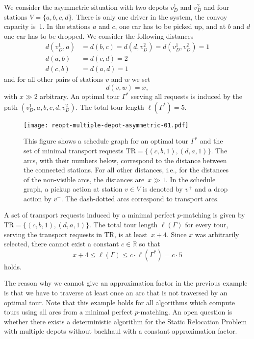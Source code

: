 \documentclass[english]{llncs}
\numberwithin{sublemma}{lemma}
\newcommand{\RR}{\ensuremath{\mathbb{R}}}
\newcommand{\tourd}{\ensuremath{\Gamma}}
\newcommand{\dist}{\ensuremath{d}}
\newcommand{\TR}{\mathrm{TR}}
\begin{document}
\begin{example}\label{ex: static: reopt: multiple: asymmetric non possible}
We consider the asymmetric situation with two depots $v_D^1$ and $v_D^2$ and four stations $V = \{ a, b, c, d \}$.
There is only one driver in the system, the convoy capacity is~$1$.
In the stations $a$ and $c$, one car has to be picked up, and at $b$ and $d$ one car has to be dropped.
We consider the following distances
\begin{align*}
  d(v_D^1, a) & = d(b, c) = d(d, v_D^2) = \dist(v_D^1, v_D^2) = 1 \\
  d(a, b) & = d(c, d) = 2 \\
  d(c, b) & = d(a, d) = 1
\end{align*}
and for all other pairs of stations $v$ and $w$ we set
\[
 d(v, w) = x,
\]
with $x \gg 2$ arbitrary.
An optimal tour $\tourd^*$ serving all requests is induced by the path $(v_D^1, a, b, c, d, v_D^2)$.
The total tour length $\ell(\tourd^*) = 5$.

\begin{figure}[ht]
    \centering
    \texttt{[image: reopt-multiple-depot-asymmetric-01.pdf]}
 \caption{
  This figure shows a schedule graph for an optimal tour ${\tourd^*}$ and the set of minimal transport requests $\TR = \{ (c, b, 1), (d, a, 1) \}$.
  The arcs, with their numbers below, correspond to the distance between the connected stations.
  For all other distances, i.e., for the distances of the non-visible arcs, the distances are~$x \gg 1$.
  In the schedule graph, a pickup action at station $v \in V$ is denoted by $v^+$ and a drop action by $v^-$.
  The dash-dotted arcs correspond to transport arcs.
 }
 \label{fig: static: reopt: multiple: asymmetric 01}
\end{figure}


A set of transport requests induced by a minimal perfect $p$-matching is given by $\TR = \{ (c, b, 1), (d, a, 1) \}$.
The total tour length $\ell(\tourd)$ for every tour, serving the transport requests in $\TR$, is at least~$x + 4$.
Since $x$ was arbitrarily selected, there cannot exist a constant $c \in \RR$ so that
\[
  x + 4 \leq \ell(\tourd) \leq c \cdot \ell(\tourd^*) = c \cdot 5
\]
holds.
\end{example}



The reason why we cannot give an approximation factor in the previous example is that we have to traverse at least once an arc that is not traversed by an optimal tour.
Note that this example holds for all algorithms which compute tours using all arcs from a minimal perfect $p$-matching.
An open question is whether there exists a deterministic algorithm for the Static Relocation Problem with multiple depots without backhaul with a constant approximation factor.
\end{document}
